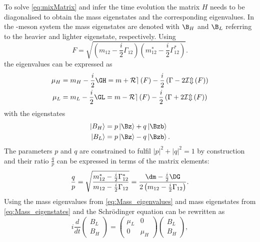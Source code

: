 To solve \cref{eq:mixMatrix} and infer the time evolution the matrix $H$ needs to be diagonalised to obtain the mass eigenstates and the corresponding eigenvalues.
In the \Bz-meson system the mass eigenstates are denoted with $\B_H$ and $\B_L$ referring to the heavier and lighter eigenstate, respectively.
Using
\begin{equation}
F=\sqrt{\left(m_{12}-\frac{i}{2}\Gamma_{12}\right)\left(m_{12}^\ast-\frac{i}{2}\Gamma_{12}^\ast\right)}.
\end{equation}
the eigenvalues can be expressed as
\begin{equation}
\begin{split}
\mu_H &= m_H-\frac{i}{2}\GH = m + \mathcal{Re}\left(F\right)-\frac{i}{2}\left(\Gamma-2\mathcal{Im}\left(F\right)\right)\\
\mu_L &= m_L-\frac{i}{2}\GL = m - \mathcal{Re}\left(F\right)-\frac{i}{2}\left(\Gamma+2\mathcal{Im}\left(F\right)\right)\label{eq:Mass_eigenvalues}
\end{split}
\end{equation}
with the eigenstates
\begin{equation}
\begin{split}
\left|B_H\right>&= p\left|\Bz\right>+q\left|\Bzb\right>\\
\left|B_L\right>&= p\left|\Bz\right>-q\left|\Bzb\right>.\label{eq:Mass_eigenstates}
\end{split}
\end{equation}
The parameters $p$ and $q$ are constrained to fulfil $\left|p\right|^2+\left|q\right|^2=1$ by construction and their ratio $\frac{q}{p}$ can be expressed in terms of the matrix elements:
\begin{equation}
\frac{q}{p}=\sqrt{ \frac{ m_{12}^\ast-\frac{i}{2}\Gamma_{12}^\ast }{ m_{12}-\frac{i}{2}\Gamma_{12} }}
=\frac{\dm-\frac{i}{2}\DG}{2\left(m_{12}-\frac{i}{2}\Gamma_{12}\right)}.\label{eq:qoverp}
\end{equation}
Using the mass eigenvalues from \cref{eq:Mass_eigenvalues} and mass eigenstates from \cref{eq:Mass_eigenstates} and the Schrödinger equation can be rewritten as
\begin{equation}
i\frac{d}{dt}\begin{pmatrix} B_L \\ B_H \end{pmatrix} = \begin{pmatrix} \mu_L & 0 \\ 0 & \mu_H \end{pmatrix}\begin{pmatrix} B_L \\ B_H \end{pmatrix},
\end{equation}
